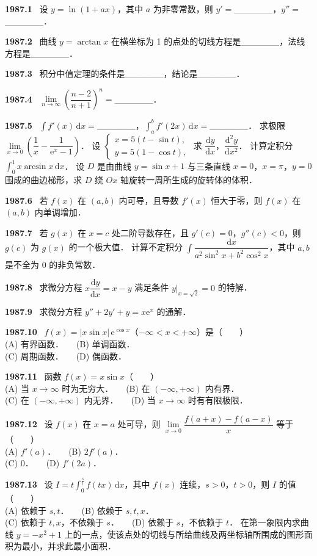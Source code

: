 \documentclass[UTF8,12pt]{ctexart}
\newcommand{\qn}[1]{\textbf{\large #1}\ }
\begin{document}
\qn{1987.1}
设 $y=\ln(1+ax)$，其中 $a$ 为非零常数，则 $y'=$______，$y''=$______．

\vfill
\newpage
\qn{1987.2}
曲线 $y=\arctan x$ 在横坐标为 1 的点处的切线方程是______，法线方程是______．

\vfill
\newpage
\qn{1987.3}
积分中值定理的条件是______，结论是______．

\vfill
\newpage
\qn{1987.4}
$\lim\limits_{n\to\infty}\left(\dfrac{n-2}{n+1}\right)^n=$______．

\vfill
\newpage
\qn{1987.5}
$\int f'(x)\,\mathrm{d}x=$______，$\int_a^b f'(2x)\,\mathrm{d}x=$______．
求极限 $\lim\limits_{x\to0}\left(\dfrac{1}{x}-\dfrac{1}{\mathrm{e}^x-1}\right)$．
设 $\begin{cases} x=5(t-\sin t), \\ y=5(1-\cos t), \end{cases}$ 求 $\dfrac{\mathrm{d}y}{\mathrm{d}x}$，$\dfrac{\mathrm{d}^2y}{\mathrm{d}x^2}$．
计算定积分 $\int_0^1 x\arcsin x\,\mathrm{d}x$．
设 $D$ 是由曲线 $y=\sin x+1$ 与三条直线 $x=0$，$x=\pi$，$y=0$ 围成的曲边梯形，求 $D$ 绕 $Ox$ 轴旋转一周所生成的旋转体的体积．

\vfill
\newpage
\qn{1987.6}
若 $f(x)$ 在 $(a,b)$ 内可导，且导数 $f'(x)$ 恒大于零，则 $f(x)$ 在 $(a,b)$ 内单调增加．

\vfill
\newpage
\qn{1987.7}
若 $g(x)$ 在 $x=c$ 处二阶导数存在，且 $g'(c)=0$，$g''(c)<0$，则 $g(c)$ 为 $g(x)$ 的一个极大值．
计算不定积分 $\int\dfrac{\mathrm{d}x}{a^2\sin^2x+b^2\cos^2x}$，其中 $a,b$ 是不全为 0 的非负常数．

\vfill
\newpage
\qn{1987.8}
求微分方程 $x\dfrac{\mathrm{d}y}{\mathrm{d}x}=x-y$ 满足条件 $\left.y\right|_{x=\sqrt{2}}=0$ 的特解．

\vfill
\newpage
\qn{1987.9}
求微分方程 $y''+2y'+y=x\mathrm{e}^x$ 的通解．

\vfill
\newpage
\qn{1987.10}
$f(x)=|x\sin x|\,\mathrm{e}^{\cos x}$（$-\infty<x<+\infty$）是（　　）
\\
\noindent (A) 有界函数．　　(B) 单调函数．
\\
\noindent (C) 周期函数．　　(D) 偶函数．

\vfill
\newpage
\qn{1987.11}
函数 $f(x)=x\sin x$（　　）
\\
\noindent (A) 当 $x\to\infty$ 时为无穷大．　　(B) 在 $(-\infty,+\infty)$ 内有界．
\\
\noindent (C) 在 $(-\infty,+\infty)$ 内无界．　　(D) 当 $x\to\infty$ 时有有限极限．

\vfill
\newpage
\qn{1987.12}
设 $f(x)$ 在 $x=a$ 处可导，则 $\lim\limits_{x\to0}\dfrac{f(a+x)-f(a-x)}{x}$ 等于（　　）
\\
\noindent (A) $f'(a)$．　　(B) $2f'(a)$．
\\
\noindent (C) $0$．　　(D) $f'(2a)$．

\vfill
\newpage
\qn{1987.13}
设 $I=t\int_0^{\frac{s}{t}}f(tx)\,\mathrm{d}x$，其中 $f(x)$ 连续，$s>0$，$t>0$，则 $I$ 的值（　　）
\\
\noindent (A) 依赖于 $s,t$．　　(B) 依赖于 $s,t,x$．
\\
\noindent (C) 依赖于 $t,x$，不依赖于 $s$．　　(D) 依赖于 $s$，不依赖于 $t$．
在第一象限内求曲线 $y=-x^2+1$ 上的一点，使该点处的切线与所给曲线及两坐标轴所围成的图形面积为最小，并求此最小面积．

\vfill
\newpage
\end{document}
